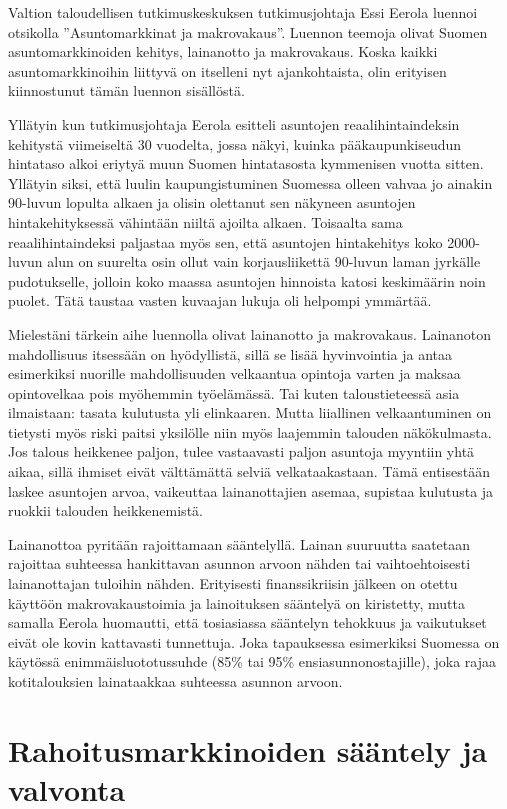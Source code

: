 \documentclass[12pt]{article}
\begin{document}
Valtion taloudellisen tutkimuskeskuksen tutkimusjohtaja Essi Eerola luennoi otsikolla ''Asuntomarkkinat ja makrovakaus''. Luennon teemoja olivat Suomen asuntomarkkinoiden kehitys, lainanotto ja makrovakaus. Koska kaikki asuntomarkkinoihin liittyvä on itselleni nyt ajankohtaista, olin erityisen kiinnostunut tämän luennon sisällöstä.

Yllätyin kun tutkimusjohtaja Eerola esitteli asuntojen reaalihintaindeksin kehitystä viimeiseltä 30 vuodelta, jossa näkyi, kuinka pääkaupunkiseudun hintataso alkoi eriytyä muun Suomen hintatasosta kymmenisen vuotta sitten. Yllätyin siksi, että luulin kaupungistuminen Suomessa olleen vahvaa jo ainakin 90-luvun lopulta alkaen ja olisin olettanut sen näkyneen asuntojen hintakehityksessä vähintään niiltä ajoilta alkaen. Toisaalta sama reaalihintaindeksi paljastaa myös sen, että asuntojen hintakehitys koko 2000-luvun alun on suurelta osin ollut vain korjausliikettä 90-luvun laman jyrkälle pudotukselle, jolloin koko maassa asuntojen hinnoista katosi keskimäärin noin puolet. Tätä taustaa vasten kuvaajan lukuja oli helpompi ymmärtää.

Mielestäni tärkein aihe luennolla olivat lainanotto ja makrovakaus. Lainanoton mahdollisuus itsessään on hyödyllistä, sillä se lisää hyvinvointia ja antaa esimerkiksi nuorille mahdollisuuden velkaantua opintoja varten ja maksaa opintovelkaa pois myöhemmin työelämässä. Tai kuten taloustieteessä asia ilmaistaan: tasata kulutusta yli elinkaaren. Mutta liiallinen velkaantuminen on tietysti myös riski paitsi yksilölle niin myös laajemmin talouden näkökulmasta. Jos talous heikkenee paljon, tulee vastaavasti paljon asuntoja myyntiin yhtä aikaa, sillä ihmiset eivät välttämättä selviä velkataakastaan. Tämä entisestään laskee asuntojen arvoa, vaikeuttaa lainanottajien asemaa, supistaa kulutusta ja ruokkii talouden heikkenemistä.

Lainanottoa pyritään rajoittamaan sääntelyllä. Lainan suuruutta saatetaan rajoittaa suhteessa hankittavan asunnon arvoon nähden tai vaihtoehtoisesti lainanottajan tuloihin nähden. Erityisesti finanssikriisin jälkeen on otettu käyttöön makrovakaustoimia ja lainoituksen sääntelyä on kiristetty, mutta samalla Eerola huomautti, että tosiasiassa sääntelyn tehokkuus ja vaikutukset eivät ole kovin kattavasti tunnettuja. Joka tapauksessa esimerkiksi Suomessa on käytössä enimmäisluototussuhde (85\% tai 95\% ensiasunnonostajille), joka rajaa kotitalouksien lainataakkaa suhteessa asunnon arvoon.


\newpage
\section{Rahoitusmarkkinoiden sääntely ja valvonta}
\end{document}
